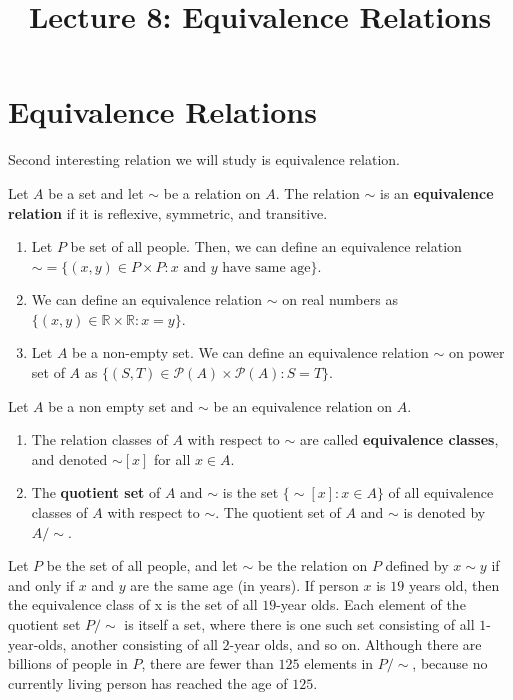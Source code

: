 \documentclass[a4paper,english,12pt]{article}
\title{Lecture 8: Equivalence Relations}
\author{}
\begin{document}
\maketitle

\section{Equivalence Relations}
Second interesting relation we will study is equivalence relation.
\begin{defn} Let $A$ be a set and let $\sim$ be a relation on $A$. The relation $\sim$ is an \textbf{equivalence relation} if it is reflexive, symmetric, and transitive.
\end{defn}
\begin{exmp}
	\begin{enumerate}
		\item Let $P$ be set of all people. Then, we can define an equivalence relation $\sim =\{(x,y) \in P \times P: x \text{ and } y \text{ have same age} \}$.
		\item We can define an equivalence relation $\sim$ on real numbers as $\{(x,y) \in \mathbb{R}\times \mathbb{R}: x = y\}$. 
		\item Let $A$ be a non-empty set. We can define an equivalence relation $\sim$ on power set of $A$ as $\{(S,T) \in \mathcal{P}(A)\times \mathcal{P}(A): S = T\}$. 
	\end{enumerate}
\end{exmp}
\begin{defn} Let $A$ be a non empty set and $\sim$ be an equivalence relation on $A$. 
	\begin{enumerate}
		\item The relation classes of $A$ with respect to $\sim$ are called \textbf{equivalence classes}, and denoted $\sim[x]$ for all $x \in A$.
		\item The \textbf{quotient set} of $A$ and $\sim$ is the set $\{\sim[x]: x \in A\}$ of all equivalence classes of $A$ with respect to $\sim$. The quotient set of $A$ and $\sim$ is denoted by $A/\sim$.
	\end{enumerate}
\end{defn}

\begin{exmp} Let $P$ be the set of all people, and let $\sim$ be the relation on $P$ defined by $x \sim y$ if and only if $x$ and $y$ are the same age (in years). If person $x$ is $19$ years old, then the equivalence class of x is the set of all $19$-year olds. Each element of the quotient set $P/\sim$ is itself a set, where there is one such set consisting of all $1$-year-olds, another consisting of all $2$-year olds, and so on. Although there are billions of
people in $P$, there are fewer than $125$ elements in $P/\sim$, because no currently living person has reached the age of $125$.
\end{exmp}
\end{document}
